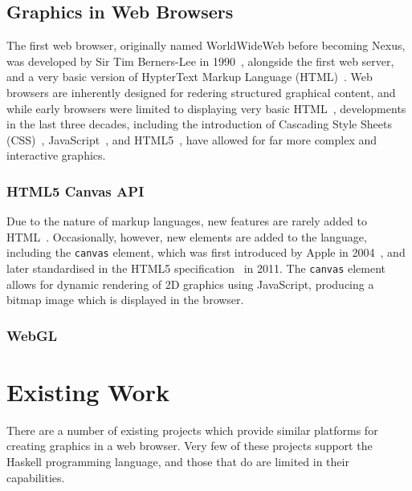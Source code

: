 \documentclass[../main.tex]{subfiles}
\begin{document}
        \subsection{Graphics in Web Browsers}
            The first web browser, originally named WorldWideWeb before becoming Nexus, was
                developed by Sir Tim Berners-Lee in 1990~\citep{X}, alongside the first web
                server, and a very basic version of HypterText Markup Language
                (HTML)~\citep{X}.
            Web browsers are inherently designed for redering structured graphical content,
                and while early browsers were limited to displaying very basic HTML~\citep{X},
                developments in the last three decades, including the introduction of Cascading
                Style Sheets (CSS)~\citep{X}, JavaScript~\citep{X}, and HTML5~\citep{X}, have
                allowed for far more complex and interactive graphics.

            \subsubsection{HTML5 Canvas API}
                Due to the nature of markup languages, new features are rarely added to
                    HTML~\citep{X}.
                Occasionally, however, new elements are added to the language, including the
                    \texttt{canvas} element, which was first introduced by Apple in 2004~\citep{X},
                    and later standardised in the HTML5 specification~\citep{X} in 2011.
                The \texttt{canvas} element allows for dynamic rendering of 2D graphics using
                    JavaScript, producing a bitmap image which is displayed in the browser.

            \subsubsection{WebGL}

    \section{Existing Work}
        There are a number of existing projects which provide similar platforms for
            creating graphics in a web browser.
        Very few of these projects support the Haskell programming language, and those
            that do are limited in their capabilities.
\end{document}
